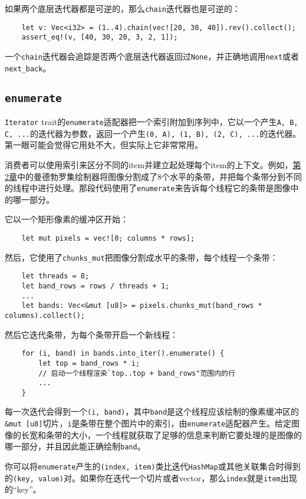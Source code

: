 如果两个底层迭代器都是可逆的，那么\texttt{chain}迭代器也是可逆的：
\begin{verbatim}
    let v: Vec<i32> = (1..4).chain(vec![20, 30, 40]).rev().collect();
    assert_eq!(v, [40, 30, 20, 3, 2, 1]);
\end{verbatim}

一个\texttt{chain}迭代器会追踪是否两个底层迭代器返回过\texttt{None}，并正确地调用\texttt{next}或者\texttt{next\_back}。

\subsection{\texttt{enumerate}}\label{enumerate}
\texttt{Iterator} trait的\texttt{enumerate}适配器把一个索引附加到序列中，它以一个产生\texttt{A, B, C, ...}的迭代器为参数，返回一个产生\texttt{(0, A), (1, B), (2, C), ...}的迭代器。第一眼可能会觉得它用处不大，但实际上它非常常用。

消费者可以使用索引来区分不同的item并建立起处理每个item的上下文。例如，\hyperref[ch02]{第2章}中的曼德勃罗集绘制器将图像分割成了8个水平的条带，并把每个条带分到不同的线程中进行处理。那段代码使用了\texttt{enumerate}来告诉每个线程它的条带是图像中的哪一部分。

它以一个矩形像素的缓冲区开始：
\begin{verbatim}
    let mut pixels = vec![0; columns * rows];
\end{verbatim}
然后，它使用了\texttt{chunks\_mut}把图像分割成水平的条带，每个线程一个条带：
\begin{verbatim}
    let threads = 8;
    let band_rows = rows / threads + 1;
    ...
    let bands: Vec<&mut [u8]> = pixels.chunks_mut(band_rows * columns).collect();
\end{verbatim}

然后它迭代条带，为每个条带开启一个新线程：
\begin{verbatim}
    for (i, band) in bands.into_iter().enumerate() {
        let top = band_rows * i;
        // 启动一个线程渲染`top..top + band_rows"范围内的行
        ...
    }
\end{verbatim}

每一次迭代会得到一个\texttt{(i, band)}，其中\texttt{band}是这个线程应该绘制的像素缓冲区的\texttt{\&mut [u8]}切片，\texttt{i}是条带在整个图片中的索引，由\texttt{enumerate}适配器产生。给定图像的长宽和条带的大小，一个线程就获取了足够的信息来判断它要处理的是图像的哪一部分，并且因此能正确绘制\texttt{band}。

你可以将\texttt{enumerate}产生的\texttt{(index, item)}类比迭代\texttt{HashMap}或其他关联集合时得到的\texttt{(key, value)}对。如果你在迭代一个切片或者vector，那么\texttt{index}就是\texttt{item}出现的“key”。

